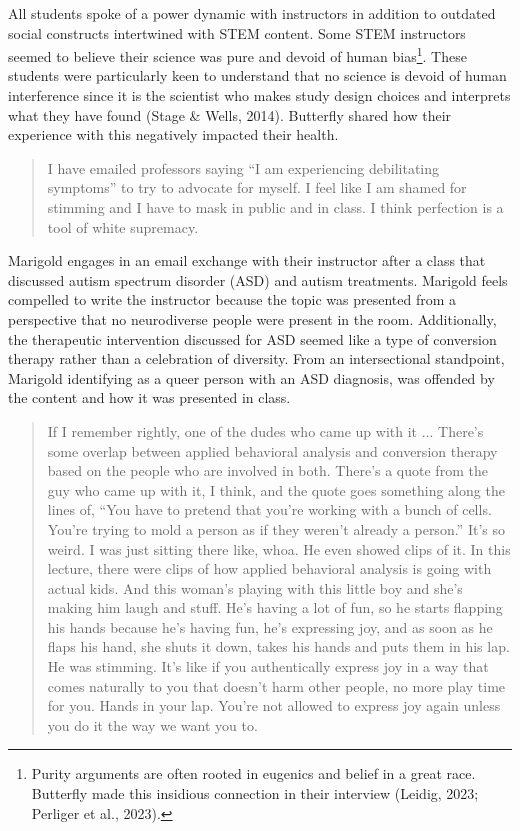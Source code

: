 \documentclass{sig-alternate} %
\begin{document}
\begin{large}
All students spoke of a power dynamic with instructors in addition to outdated social constructs intertwined with STEM content. Some STEM instructors seemed to believe their science was pure and devoid of human bias\footnote{Purity arguments are often rooted in eugenics and belief in a great race. Butterfly made this insidious connection in their interview (Leidig, 2023; Perliger et al., 2023).}. These students were particularly keen to understand that no science is devoid of human interference since it is the scientist who makes study design choices and interprets what they have found (Stage \& Wells, 2014). Butterfly shared how their experience with this negatively impacted their health.

\begin{quote}
I have emailed professors saying “I am experiencing debilitating symptoms” to try to advocate for myself. I feel like I am shamed for stimming and I have to mask in public and in class. I think perfection is a tool of white supremacy.
\end{quote}

Marigold engages in an email exchange with their instructor after a class that discussed autism spectrum disorder (ASD) and autism treatments. Marigold feels compelled to write the instructor because the topic was presented from a perspective that no neurodiverse people were present in the room. Additionally, the therapeutic intervention discussed for ASD seemed like a type of conversion therapy rather than a celebration of diversity. From an intersectional standpoint, Marigold identifying as a queer person with an ASD diagnosis, was offended by the content and how it was presented in class.

\begin{quote}
If I remember rightly, one of the dudes who came up with it ... There's some overlap between applied behavioral analysis and conversion therapy based on the people who are involved in both. There's a quote from the guy who came up with it, I think, and the quote goes something along the lines of, “You have to pretend that you're working with a bunch of cells. You're trying to mold a person as if they weren't already a person.” It's so weird. I was just sitting there like, whoa. He even showed clips of it. In this lecture, there were clips of how applied behavioral analysis is going with actual kids. And this woman's playing with this little boy and she's making him laugh and stuff. He's having a lot of fun, so he starts flapping his hands because he's having fun, he's expressing joy, and as soon as he flaps his hand, she shuts it down, takes his hands and puts them in his lap. He was stimming. It’s like if you authentically express joy in a way that comes naturally to you that doesn't harm other people, no more play time for you. Hands in your lap. You're not allowed to express joy again unless you do it the way we want you to.
\end{quote}


\end{large}
\end{document}
